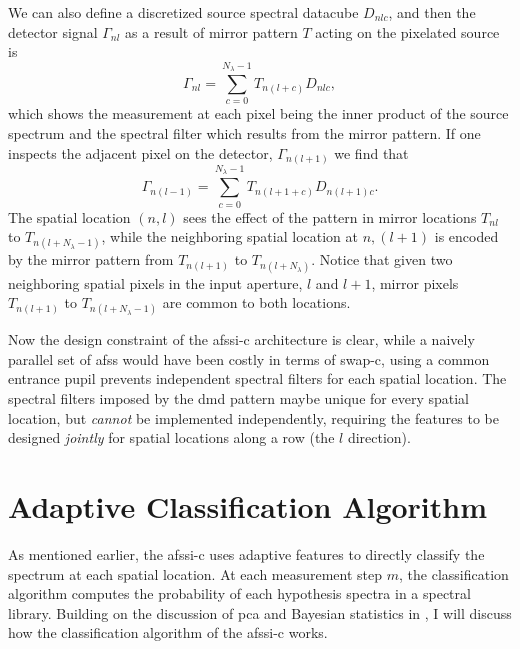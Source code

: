 We can also define a discretized source spectral datacube $D_{nlc}$, and then the detector signal $\Gamma_{nl}$ as a result of mirror pattern $T$ acting on the pixelated source is
%
%
\begin{equation}
	\Gamma_{nl} = \sum^{N_{\lambda}-1}_{c = 0} T_{n \left( l + c \right)} D_{nlc},
\end{equation}
%
%
which shows the measurement at each pixel being the inner product of the source spectrum and the spectral filter which results from the mirror pattern. If one inspects the adjacent pixel on the detector, $\Gamma_{n \left(l +1 \right)}$ we find that
%
%
\begin{equation}
\Gamma_{n\left(l-1\right)} = \sum^{N_{\lambda}-1}_{c = 0} T_{n\left( l + 1 + c \right)} D_{n\left(l+1\right)c}.
\end{equation}
%
%
The spatial location $\left(n,l \right)$ sees the effect of the pattern in mirror locations $T_{nl}$ to $T_{n\left(l+N_{\lambda}-1\right)}$, while the neighboring spatial location at $n, \left( l + 1\right)$ is encoded by the mirror pattern from $T_{n\left(l+1\right)}$ to $T_{n\left(l + N_{\lambda} \right)}$. Notice that given two neighboring spatial pixels in the input aperture, $l$ and $l+1$, mirror pixels $T_{n\left( l + 1 \right)}$ to $T_{n\left(l + N_{\lambda} - 1 \right)}$ are common to both locations. 

Now the design constraint of the \gls{afssi-c} architecture is clear, while a naively parallel set of \gls{afss} would have been costly in terms of \gls{swap-c}, using a common entrance pupil prevents independent spectral filters for each spatial location. The spectral filters imposed by the \gls{dmd} pattern maybe unique for every spatial location, but \textit{cannot} be implemented independently, requiring the features to be designed \textit{jointly} for spatial locations along a row (the $l$ direction).



\section{Adaptive Classification Algorithm}

As mentioned earlier, the \gls{afssi-c} uses adaptive features to directly classify the spectrum at each spatial location. At each measurement step $m$, the classification algorithm computes the probability of each hypothesis spectra in a spectral library. Building on the discussion of \acrfull{pca} and Bayesian statistics in , I will discuss how the classification algorithm of the \gls{afssi-c} works. 


